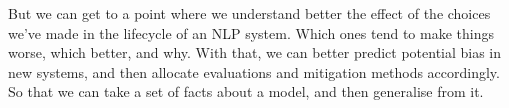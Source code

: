 But we can get to a point where we understand better the effect of the choices we've made in the lifecycle of an NLP system. Which ones tend to make things worse, which better, and why. With that, we can better predict potential bias in new systems, and then allocate evaluations and mitigation methods accordingly. So that we can take a set of facts about a model, and then generalise from it. %














